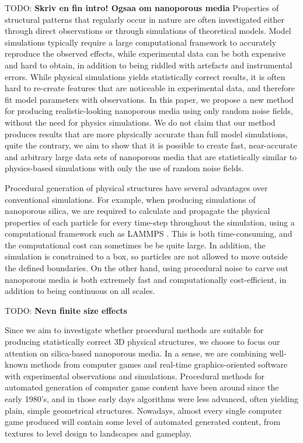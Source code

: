 \documentclass[aps,pre,twocolumn,letterpaper,floatfix,showpacs]{revtex4}
\newcommand{\todo}[1]{ {\color{Magenta} TODO: \color{Blue} \textbf{#1} }}
\begin{document}
\todo{Skriv en fin intro! Ogsaa om nanoporous media}
Properties of structural patterns that regularly occur in nature are often investigated either through direct observations or through simulations of theoretical models. Model simulations typically require a large computational framework to accurately reproduce the observed effects, while experimental data can be both expensive and hard to obtain, in addition to being riddled with artefacts and instrumental errors. While physical simulations yields statistically correct results, it is often hard to re-create features that are noticeable in experimental data, and therefore fit model parameters with observations. In this paper, we propose a new method for producing realistic-looking nanoporous media using only random noise fields, without the need for physics simulations. We do not claim that our method produces results that are more physically accurate than full model simulations, quite the contrary, we aim to show that it is possible to create fast, near-accurate and arbitrary large data sets of nanoporous media that are statistically similar to physics-based simulations with only the use of random noise fields.  

Procedural generation of physical structures have several advantages over conventional simulations. For example, when producing simulations of nanoporous silica, we are required to calculate and propagate the physical properties of each particle for every time-step throughout the simulation, using a computational framework such as LAMMPS \cite{plimpton1995fast}. This is both time-consuming, and the computational cost can sometimes be be quite large. In addition, the simulation is constrained to a box, so particles are not allowed to move outside the defined boundaries. On the other hand, using procedural noise to carve out nanoporous media is both extremely fast and computationally cost-efficient, in addition to being continuous on all scales. 

\todo{Nevn finite size effects}

Since we aim to investigate whether procedural methods are suitable for producing statistically correct 3D physical structures, we choose to focus our attention on silica-based nanoporous media. In a sense, we are combining well-known methods from computer games and real-time graphics-oriented software with experimental observations and simulations. Procedural methods for automated generation of computer game content have been around since the early 1980's, and in those early days algorithms were less advanced, often yielding plain, simple geometrical structures. Nowadays, almost every single computer game produced will contain some level of automated generated content, from textures to level design to landscapes and gameplay. 
\end{document}
